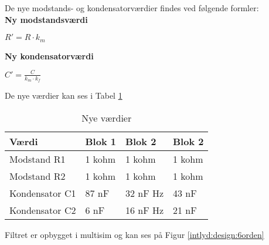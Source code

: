 De nye modstands- og kondensatorværdier findes ved følgende formler:\\
\textbf{Ny modstandsværdi}
\begin{center}
$R'=R\cdot { k }_{ m }$
\end{center}

\textbf{Ny kondensatorværdi}
\begin{center}
$C'=\frac { C }{ { k }_{ m }\cdot { k }_{ f } }$ 
\end{center}

De nye værdier kan ses i Tabel \ref{IL:design:values}

\begin{table}[H]
	\caption{Nye værdier }
\begin{center}
    \begin{tabular}{ | l | l | l | l |}
    \hline 
    \textbf{Værdi} 	& \textbf{Blok 1}  &\textbf{Blok 2}	&\textbf{Blok 2}  	\\ \hline
    Modstand R1	 	& 1 kohm   				&1 kohm				&1 kohm				\\ \hline
    Modstand R2 	& 1 kohm  				&1 kohm 			&1 kohm				\\ \hline
    Kondensator C1 			& 87 nF  				&32 nF Hz 				&43 nF 				\\ \hline	
    Kondensator C2 			& 6 nF  				&16 nF Hz 				&21 nF					\\ \hline
    \end{tabular}
\end{center}
	\label{IL:design:values}
\end{table}

Filtret er opbygget i multisim og kan ses på Figur \ref{intlyd:design:6orden}









